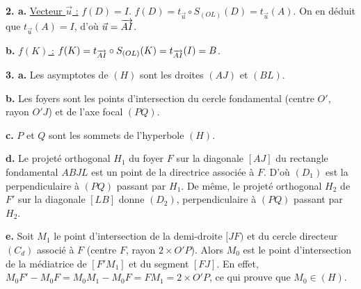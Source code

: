 \documentclass[11pt]{article}
\begin{document}
\begin{center}
\end{center}

\textbf{2. a.} \underline{Vecteur $\vec{u}$ :} $f(D) = I$. $f(D) = t_{\vec{u}} \circ S_{(OL)}(D) = t_{\vec{u}}(A)$. On en déduit que $t_{\vec{u}}(A) = I$, d'où $\vec{u} = \overrightarrow{AI}$.

\textbf{b.} \underline{$f(K)$ :} $f(K) = t_{\overrightarrow{AI}} \circ S_{(OL)}(K) = t_{\overrightarrow{AI}}(I) = B$.

\textbf{3. a.} Les asymptotes de $(H)$ sont les droites $(AJ)$ et $(BL)$.

\textbf{b.} Les foyers sont les points d'intersection du cercle fondamental (centre $O'$, rayon $O'J$) et de l'axe focal $(PQ)$.

\textbf{c.} $P$ et $Q$ sont les sommets de l'hyperbole $(H)$.

\textbf{d.} Le projeté orthogonal $H_1$ du foyer $F$ sur la diagonale $[AJ]$ du rectangle fondamental $ABJL$ est un point de la directrice associée à $F$. D'où $(D_1)$ est la perpendiculaire à $(PQ)$ passant par $H_1$. De même, le projeté orthogonal $H_2$ de $F'$ sur la diagonale $[LB]$ donne $(D_2)$, perpendiculaire à $(PQ)$ passant par $H_2$.

\textbf{e.} Soit $M_1$ le point d'intersection de la demi-droite $[JF)$ et du cercle directeur $(C_d)$ associé à $F$ (centre $F$, rayon $2 \times O'P$). Alors $M_0$ est le point d'intersection de la médiatrice de $[F'M_1]$ et du segment $[FJ]$. En effet, $M_0F' - M_0F = M_0M_1 - M_0F = FM_1 = 2 \times O'P$, ce qui prouve que $M_0 \in (H)$.
\end{document}
